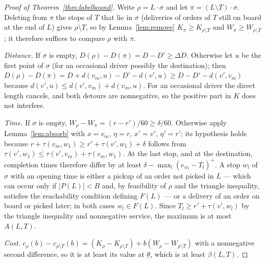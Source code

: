 \documentclass[review,12pt]{elsarticle}
\theoremstyle{definition}
\theoremstyle{remark}
\newcommand{\lth}{\underline{\theta}}
\begin{document}
\begin{proof}[Proof of Theorem~\ref{thm:labelbound}]
Write $\rho=L\cdot\sigma$ and let $\pi=(L\setminus T)\cdot\sigma$. Deleting
from $\pi$ the stops of $T$ that lie in $\sigma$ (deliveries of orders of $T$
still on board at the end of $L$) gives $\rho\setminus T$, so by
Lemma~\ref{lem:remove} $K_\pi\ge K_{\rho\setminus T}$ and
$W_\pi\ge W_{\rho\setminus T}$; it therefore suffices to compare $\rho$ with
$\pi$.

\emph{Distance.} If $\sigma$ is empty, $D(\rho)-D(\pi)=D-D'\ge\Delta D$.
Otherwise let $u$ be the first point of $\sigma$ (for an occasional driver
possibly the destination); then
$D(\rho)-D(\pi)=D+d(v_m,u)-D'-d(v',u)\ge D-D'-d(v',v_m)$ because
$d(v',u)\le d(v',v_m)+d(v_m,u)$. For an occasional driver the direct length
cancels, and both detours are nonnegative, so the positive part in $K$ does
not interfere.

\emph{Time.} If $\sigma$ is empty, $W_\rho-W_\pi=(r-r')/60\ge\delta/60$.
Otherwise apply Lemma~\ref{lem:absorb} with $x=v_m$, $\eta=r$, $x'=v'$,
$\eta'=r'$; its hypothesis holds because
$r+\tau(v_m,w_1)\ge r'+\tau(v',w_1)+\delta$ follows from
$\tau(v',w_1)\le\tau(v',v_m)+\tau(v_m,w_1)$. At the last stop, and at the
destination, completion times therefore differ by at least
$\delta-\max_l(e_{w_l}-T_l)^+$. A stop $w_l$ of $\sigma$ with an opening time
is either a pickup of an order not picked in $L$ --- which can occur only if
$|P(L)|<B$ and, by feasibility of $\rho$ and the triangle inequality,
satisfies the reachability condition defining $F(L)$ --- or a delivery of an
order on board or picked later; in both cases $w_l\in F(L)$. Since
$T_l\ge r'+\tau(v',w_l)$ by the triangle inequality and nonnegative service,
the maximum is at most $A(L,T)$.

\emph{Cost.} $c_\rho(b)-c_{\rho\setminus T}(b)=(K_\rho-K_{\rho\setminus T})
+b(W_\rho-W_{\rho\setminus T})$ with a nonnegative second difference, so it is
at least its value at $\lth$, which is at least $\beta(L,T)$.
\end{proof}
\end{document}
